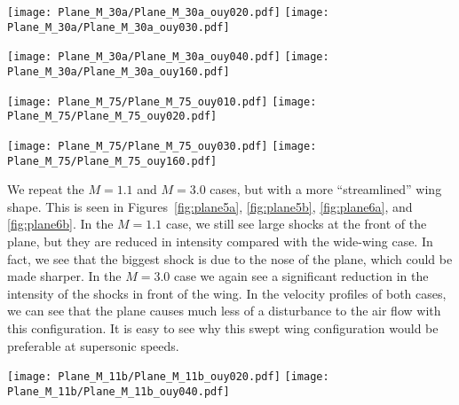 \documentclass[twocolumn]{myarticle}
\numberwithin{equation}{section}
\begin{document}
\begin{figure*}[ht]
    \centering
    \texttt{[image: Plane\_M\_30a/Plane\_M\_30a\_ouy020.pdf]}
    \texttt{[image: Plane\_M\_30a/Plane\_M\_30a\_ouy030.pdf]}
    \caption{Airplane simulation with $ M = 3.0 $ (supersonic).}
    \label{fig:plane3a}
\end{figure*}

\begin{figure*}[ht]
    \centering
    \texttt{[image: Plane\_M\_30a/Plane\_M\_30a\_ouy040.pdf]}
    \texttt{[image: Plane\_M\_30a/Plane\_M\_30a\_ouy160.pdf]}
    \caption{Airplane simulation with $ M = 3.0 $ (supersonic).}
    \label{fig:plane3b}
\end{figure*}


\begin{figure*}[ht]
    \centering
    \texttt{[image: Plane\_M\_75/Plane\_M\_75\_ouy010.pdf]}
    \texttt{[image: Plane\_M\_75/Plane\_M\_75\_ouy020.pdf]}
    \caption{Airplane simulation with $ M = 7.5 $ (hypersonic).}
    \label{fig:plane4a}
\end{figure*}

\begin{figure*}[ht]
    \centering
    \texttt{[image: Plane\_M\_75/Plane\_M\_75\_ouy030.pdf]}
    \texttt{[image: Plane\_M\_75/Plane\_M\_75\_ouy160.pdf]}
    \caption{Airplane simulation with $ M = 7.5 $ (hypersonic).}
    \label{fig:plane4b}
\end{figure*}


We repeat the $ M = 1.1 $ and $ M = 3.0 $ cases, but with a more ``streamlined'' wing shape.
This is seen in Figures~\ref{fig:plane5a}, \ref{fig:plane5b}, \ref{fig:plane6a}, and \ref{fig:plane6b}. 
In the $ M = 1.1 $ case, we still see large shocks at the front of the plane, but they are reduced in intensity compared with the wide-wing case.
In fact, we see that the biggest shock is due to the nose of the plane, which could be made sharper.
In the $ M = 3.0 $ case we again see a significant reduction in the intensity of the shocks in front of the wing.
In the velocity profiles of both cases, we can see that the plane causes much less of a disturbance to the air flow with this configuration.
It is easy to see why this swept wing configuration would be preferable at supersonic speeds.

\begin{figure*}[ht]
    \centering
    \texttt{[image: Plane\_M\_11b/Plane\_M\_11b\_ouy020.pdf]}
    \texttt{[image: Plane\_M\_11b/Plane\_M\_11b\_ouy040.pdf]}
    \caption{Airplane simulation with $ M = 1.1 $ (supersonic).}
    \label{fig:plane5a}
\end{figure*}
\end{document}
